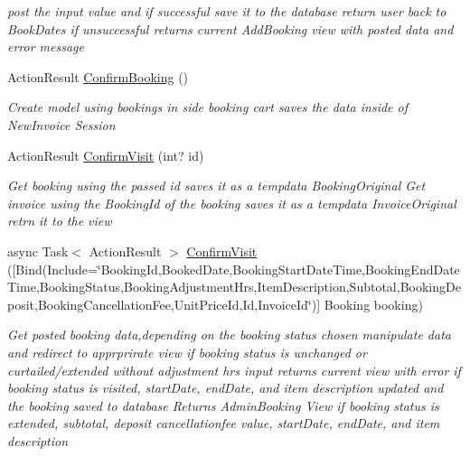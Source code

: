 \begin{DoxyCompactItemize}
\begin{DoxyCompactList}\small\item\em post the input value and if successful save it to the database return user back to Book\+Dates if unsuccessful returns current Add\+Booking view with posted data and error message \end{DoxyCompactList}\item 
Action\+Result \hyperlink{class_alfa_accounting_1_1_controllers_1_1_booking_view_models_controller_a27f68c32481b86742af2ecc237d8ec65}{Confirm\+Booking} ()
\begin{DoxyCompactList}\small\item\em Create model using bookings in side booking cart saves the data inside of New\+Invoice Session \end{DoxyCompactList}\item 
Action\+Result \hyperlink{class_alfa_accounting_1_1_controllers_1_1_booking_view_models_controller_aa3cf39dd1c42f4d3277be49ee71bda48}{Confirm\+Visit} (int? id)
\begin{DoxyCompactList}\small\item\em Get booking using the passed id saves it as a tempdata Booking\+Original Get invoice using the Booking\+Id of the booking saves it as a tempdata Invoice\+Original retrn it to the view \end{DoxyCompactList}\item 
async Task$<$ Action\+Result $>$ \hyperlink{class_alfa_accounting_1_1_controllers_1_1_booking_view_models_controller_a30ebb6edf4dab2b9d02a3fbac9570bae}{Confirm\+Visit} (\mbox{[}Bind(Include=\char`\"{}Booking\+Id,Booked\+Date,Booking\+Start\+Date\+Time,Booking\+End\+Date\+Time,Booking\+Status,Booking\+Adjustment\+Hrs,Item\+Description,Subtotal,Booking\+Deposit,Booking\+Cancellation\+Fee,Unit\+Price\+Id,Id,Invoice\+Id\char`\"{})\mbox{]} Booking booking)
\begin{DoxyCompactList}\small\item\em Get posted booking data,depending on the booking status chosen manipulate data and redirect to apprprirate view if booking status is unchanged or curtailed/extended without adjustment hrs input returns current view with error if booking status is visited, start\+Date, end\+Date, and item description updated and the booking saved to database Returns Admin\+Booking View if booking status is extended, subtotal, deposit cancellationfee value, start\+Date, end\+Date, and item description \end{DoxyCompactList}\item 

\end{DoxyCompactItemize}
